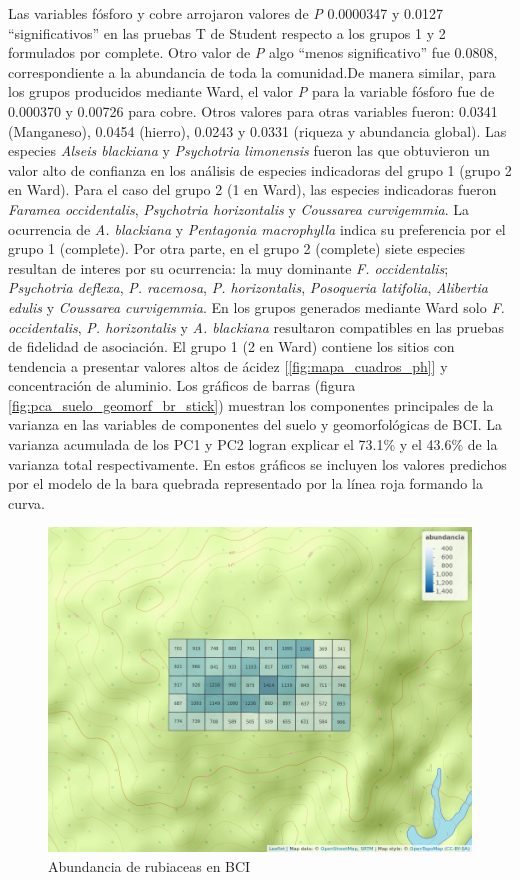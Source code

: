 \documentclass[11pt,]{article}
\begin{document}
Las variables fósforo y cobre arrojaron valores de \emph{P} 0.0000347 y
0.0127 ``significativos'' en las pruebas T de Student respecto a los
grupos 1 y 2 formulados por complete. Otro valor de \emph{P} algo
``menos significativo'' fue 0.0808, correspondiente a la abundancia de
toda la comunidad.De manera similar, para los grupos producidos mediante
Ward, el valor \emph{P} para la variable fósforo fue de 0.000370 y
0.00726 para cobre. Otros valores para otras variables fueron: 0.0341
(Manganeso), 0.0454 (hierro), 0.0243 y 0.0331 (riqueza y abundancia
global). Las especies \emph{Alseis blackiana} y \emph{Psychotria
limonensis} fueron las que obtuvieron un valor alto de confianza en los
análisis de especies indicadoras del grupo 1 (grupo 2 en Ward). Para el
caso del grupo 2 (1 en Ward), las especies indicadoras fueron
\emph{Faramea occidentalis}, \emph{Psychotria horizontalis} y
\emph{Coussarea curvigemmia}. La ocurrencia de \emph{A. blackiana} y
\emph{Pentagonia macrophylla} indica su preferencia por el grupo 1
(complete). Por otra parte, en el grupo 2 (complete) siete especies
resultan de interes por su ocurrencia: la muy dominante \emph{F.
occidentalis}; \emph{Psychotria deflexa}, \emph{P. racemosa}, \emph{P.
horizontalis}, \emph{Posoqueria latifolia}, \emph{Alibertia edulis} y
\emph{Coussarea curvigemmia}. En los grupos generados mediante Ward solo
\emph{F. occidentalis}, \emph{P. horizontalis} y \emph{A. blackiana}
resultaron compatibles en las pruebas de fidelidad de asociación. El
grupo 1 (2 en Ward) contiene los sitios con tendencia a presentar
valores altos de ácidez {[}\ref{fig:mapa_cuadros_ph}{]} y concentración
de aluminio. Los gráficos de barras (figura
\ref{fig:pca_suelo_geomorf_br_stick}) muestran los componentes
principales de la varianza en las variables de componentes del suelo y
geomorfológicas de BCI. La varianza acumulada de los PC1 y PC2 logran
explicar el 73.1\% y el 43.6\% de la varianza total respectivamente. En
estos gráficos se incluyen los valores predichos por el modelo de la
bara quebrada representado por la línea roja formando la curva.

\begin{figure}
\centering
\includegraphics{mapa_cuadros_abun_rubic.png}
\caption{Abundancia de rubiaceas en BCI
\label{fig:mapa_cuadros_abun_rubic}}
\end{figure}
\end{document}
